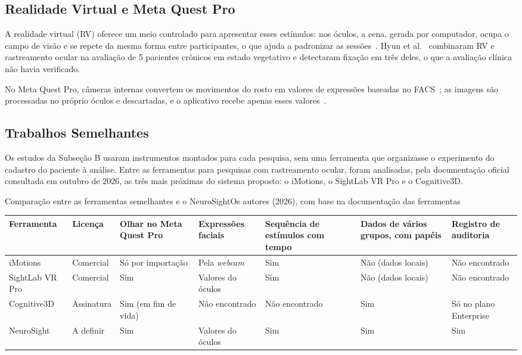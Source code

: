 \documentclass[conference,a4paper,10pt]{IEEEtran}
\begin{document}
\subsection{Realidade Virtual e Meta Quest Pro}

A realidade virtual (RV) oferece um meio controlado para apresentar esses estímulos: nos óculos, a cena, gerada por computador, ocupa o campo de visão e se repete da mesma forma entre participantes, o que ajuda a padronizar as sessões~\cite{CLAY}. Hyun et al.~\cite{HYUN} combinaram RV e rastreamento ocular na avaliação de 5 pacientes crônicos em estado vegetativo e detectaram fixação em três deles, o que a avaliação clínica não havia verificado.

No Meta Quest Pro, câmeras internas convertem os movimentos do rosto em valores de expressões baseadas no FACS~\cite{META-MOVE}; as imagens são processadas no próprio óculos e descartadas, e o aplicativo recebe apenas esses valores~\cite{META-FACE-PRIV}.

\subsection{Trabalhos Semelhantes}

Os estudos da Subseção B usaram instrumentos montados para cada pesquisa, sem uma ferramenta que organizasse o experimento do cadastro do paciente à análise. Entre as ferramentas para pesquisas com rastreamento ocular, foram analisadas, pela documentação oficial consultada em outubro de 2026, as três mais próximas do sistema proposto: o iMotions, o SightLab VR Pro e o Cognitive3D.

\begin{tabela*}[!t]{Comparação entre as ferramentas semelhantes e o NeuroSight}{Os autores (2026), com base na documentação das ferramentas}
  \footnotesize
  \begin{tabularx}{\textwidth}{l|l|Y|Y|Y|Y|Y}
    \hline
    \textbf{Ferramenta} & \textbf{Licença} & \textbf{Olhar no Meta Quest Pro} & \textbf{Expressões faciais} & \textbf{Sequência de estímulos com tempo} & \textbf{Dados de vários grupos, com papéis} & \textbf{Registro de auditoria} \\
    \hline
    iMotions & Comercial & Só por importação & Pela \textit{webcam} & Sim & Não (dados locais) & Não encontrado \\
    SightLab VR Pro & Comercial & Sim & Valores do óculos & Sim & Não (dados locais) & Não encontrado \\
    Cognitive3D & Assinatura & Sim (em fim de vida) & Não encontrado & Não encontrado & Sim & Só no plano Enterprise \\
    NeuroSight & A definir & Sim & Valores do óculos & Sim & Sim & Sim \\
    \hline
  \end{tabularx}
\end{tabela*}
\end{document}
